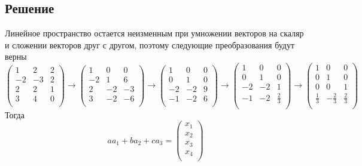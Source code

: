\documentclass{article}
\begin{document}
    \subsection{Решение}
    Линейное пространство остается неизменным при умножении векторов на скаляр и сложении векторов друг с другом, поэтому следующие преобразования будут верны \\
    \[
    \begin{pmatrix}
        1 & 2 & 2 \\
        -2 & -3 & 2 \\
        2 & 2 & 1 \\
        3 & 4 & 0 \\
    \end{pmatrix}
    \to
    \begin{pmatrix}
        1 & 0 & 0 \\
        -2 & 1 & 6 \\
        2 & -2 & -3 \\
        3 & -2 & -6 \\
    \end{pmatrix}
    \to
    \begin{pmatrix}
        1 & 0 & 0 \\
        0 & 1 & 0 \\
        -2 & -2 & 9 \\
        -1 & -2 & 6 \\
    \end{pmatrix}
    \to
    \begin{pmatrix}
        1 & 0 & 0 \\
        0 & 1 & 0 \\
        -2 & -2 & 1 \\
        -1 & -2 & \frac{2}{3} \\
    \end{pmatrix}
    \to
    \begin{pmatrix}
        1 & 0 & 0 \\
        0 & 1 & 0 \\
        0 & 0 & 1 \\
        \frac{1}{3} & -\frac{2}{3} & \frac{2}{3} \\
    \end{pmatrix}    
    \]
    Тогда
    \[a a_1 + b a_2 + c a_3 = 
    \begin{pmatrix}
        x_1 \\
        x_2 \\
        x_3 \\
        x_4 \\
    \end{pmatrix}
    \]
\end{document}
